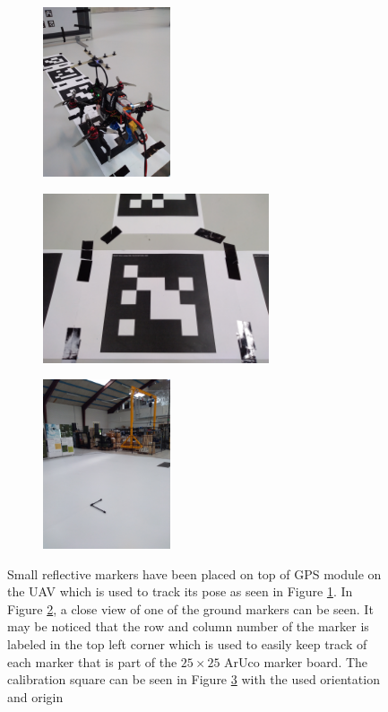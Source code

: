 \documentclass[../Head/report.tex]{subfiles}
\begin{document}
\begin{figure}[H]
    \centering
     \hspace{-0.5em}
    \begin{subfigure}[t]{.3\textwidth}
        \centering
        \includegraphics[height=5.0cm]{../Figures/optitrack/drone_with_markers.jpg}
        \caption{}
        \label{fig:drone_with_markers}
    \end{subfigure}
    \hspace{-2.0em}
    \begin{subfigure}[t]{.3\textwidth}
        \centering
        \includegraphics[height=5.0cm]{../Figures/optitrack/ground_markers.jpg}
        \caption{}
        \label{fig:ground_markers}
    \end{subfigure}
    \hspace{2.5em}
    \begin{subfigure}[t]{.3\textwidth}
        \centering
        \includegraphics[height=5.0cm]{../Figures/optitrack/marker_plane_stick_one.jpg}
        \caption{}
        \label{fig:marker_plane_stick}
    \end{subfigure}
    \caption{Small reflective markers have been placed on top of GPS module on the UAV which is used to track its pose as seen in Figure \ref{fig:drone_with_markers}. In Figure \ref{fig:ground_markers}, a close view of one of the ground markers can be seen. It may be noticed that the row and column number of the marker is labeled in the top left corner which is used to easily keep track of each marker that is part of the $25 \times 25$ ArUco marker board. The calibration square can be seen in Figure \ref{fig:marker_plane_stick} with the used orientation and origin}  
    \label{fig:optitrack_setup_drone}
\end{figure}  
\end{document}
